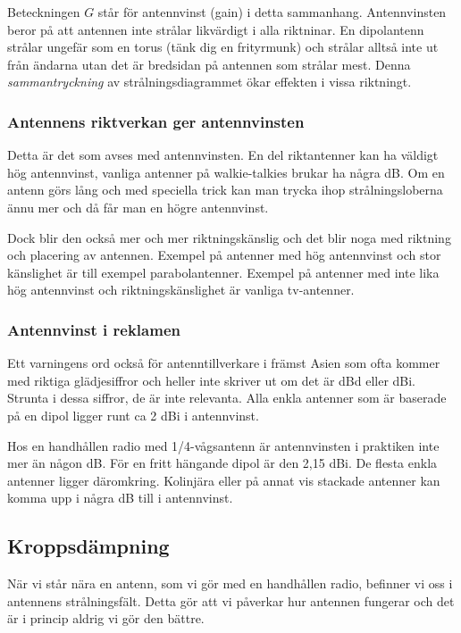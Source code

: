 Beteckningen $G$ står för antennvinst (gain) i detta sammanhang. Antennvinsten beror på att antennen inte strålar likvärdigt i alla riktninar. En dipolantenn strålar ungefär som en torus (tänk dig en frityrmunk) och strålar alltså inte ut från ändarna utan det är bredsidan på antennen som strålar mest. Denna \textit{sammantryckning} av strålningsdiagrammet ökar effekten i vissa riktningt.

\subsubsection{Antennens riktverkan ger antennvinsten}

Detta är det som avses med antennvinsten. En del riktantenner kan ha väldigt hög antennvinst, vanliga antenner på walkie-talkies brukar ha några dB. Om en antenn görs lång och med speciella trick kan man trycka ihop strålningsloberna ännu mer och då får man en högre antennvinst.

Dock blir den också mer och mer riktningskänslig och det blir noga med riktning och placering av antennen. Exempel på antenner med hög antennvinst och stor känslighet är till exempel parabolantenner. Exempel på antenner med inte lika hög antennvinst och riktningskänslighet är vanliga tv-antenner.

\subsubsection{Antennvinst i reklamen}

Ett varningens ord också för antenntillverkare i främst Asien som ofta kommer med riktiga glädjesiffror och heller inte skriver ut om det är dBd eller dBi. Strunta i dessa siffror, de är inte relevanta. Alla enkla antenner som är baserade på en dipol ligger runt ca 2 dBi i antennvinst. 

Hos en handhållen radio med 1/4-vågsantenn är antennvinsten i praktiken inte mer än någon dB. För en fritt hängande dipol är den 2,15 dBi. De flesta enkla antenner ligger däromkring. Kolinjära eller på annat vis stackade antenner kan komma upp i några dB till i antennvinst.

\subsection{Kroppsdämpning}

När vi står nära en antenn, som vi gör med en handhållen radio, befinner vi oss i antennens strålningsfält. Detta gör att vi påverkar hur antennen fungerar och det är i princip aldrig vi gör den bättre. 

